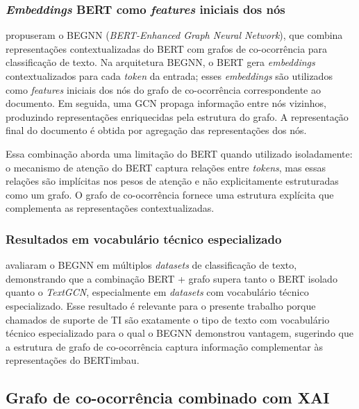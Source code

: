 \documentclass[
    12pt,                %
    openright,           %
    oneside,             %
    a4paper,             %
    english,             %
    brazil               %
]{abntex2}
\begin{document}
\subsubsection{\textit{Embeddings} BERT como \textit{features} iniciais dos nós}
\label{subsubsec:bert_grafo_embeddings}

 propuseram o BEGNN (\textit{BERT-Enhanced Graph Neural Network}), que combina representações contextualizadas do BERT com grafos de co-ocorrência para classificação de texto. Na arquitetura BEGNN, o BERT gera \textit{embeddings} contextualizados para cada \textit{token} da entrada; esses \textit{embeddings} são utilizados como \textit{features} iniciais dos nós do grafo de co-ocorrência correspondente ao documento. Em seguida, uma GCN propaga informação entre nós vizinhos, produzindo representações enriquecidas pela estrutura do grafo. A representação final do documento é obtida por agregação das representações dos nós.

Essa combinação aborda uma limitação do BERT quando utilizado isoladamente: o mecanismo de atenção do BERT captura relações entre \textit{tokens}, mas essas relações são implícitas nos pesos de atenção e não explicitamente estruturadas como um grafo. O grafo de co-ocorrência fornece uma estrutura explícita que complementa as representações contextualizadas.

\subsubsection{Resultados em vocabulário técnico especializado}
\label{subsubsec:bert_grafo_resultados}

 avaliaram o BEGNN em múltiplos \textit{datasets} de classificação de texto, demonstrando que a combinação BERT + grafo supera tanto o BERT isolado quanto o \textit{TextGCN}, especialmente em \textit{datasets} com vocabulário técnico especializado. Esse resultado é relevante para o presente trabalho porque chamados de suporte de TI são exatamente o tipo de texto com vocabulário técnico especializado para o qual o BEGNN demonstrou vantagem, sugerindo que a estrutura de grafo de co-ocorrência captura informação complementar às representações do BERTimbau.

\subsection{Grafo de co-ocorrência combinado com XAI}
\label{subsec:grafo_xai}
\end{document}
